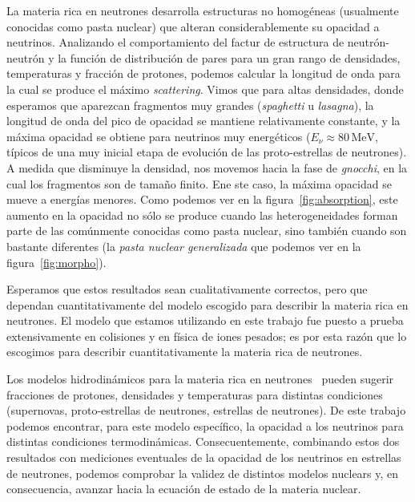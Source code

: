 La materia rica en neutrones desarrolla estructuras no homogéneas (usualmente conocidas como pasta nuclear) que alteran considerablemente su opacidad a neutrinos.
Analizando el comportamiento del factur de estructura de neutrón-neutrón y la función de distribución de pares para un gran rango de densidades, temperaturas y fracción de protones, podemos calcular la longitud de onda para la cual se produce el máximo \emph{scattering}.
Vimos que para altas densidades, donde esperamos que aparezcan fragmentos muy grandes (\emph{spaghetti} u \emph{lasagna}), la longitud de onda del pico de opacidad se mantiene relativamente constante, y la máxima opacidad se obtiene para neutrinos muy energéticos ($E_\nu \approx 80\,\text{MeV}$, típicos de una muy inicial etapa de evolución de las proto-estrellas de neutrones).
A medida que disminuye la densidad, nos movemos hacia la fase de \emph{gnocchi}, en la cual los fragmentos son de tamaño finito.
Ene ste caso, la máxima opacidad se mueve a energías menores.
Como podemos ver en la figura~\ref{fig:absorption}, este aumento en la opacidad no sólo se produce cuando las heterogeneidades forman parte de las comúnmente conocidas como pasta nuclear, sino también cuando son bastante diferentes (la \emph{pasta nuclear generalizada} que podemos ver en la figura~\ref{fig:morpho}).

Esperamos que estos resultados sean cualitativamente correctos, pero que dependan cuantitativamente del modelo escogido para describir la materia rica en neutrones.
El modelo que estamos utilizando en este trabajo fue puesto a prueba extensivamente en colisiones y en física de iones pesados; es por esta razón que lo escogimos para describir cuantitativamente la materia rica de neutrones.

Los modelos hidrodinámicos para la materia rica en neutrones~\cite{ruffert_coalescing_1995, mezzacappa_investigation_1998, geppert_temperature_2004, woosley_physics_2005, liebendorfer_supernova_2005} pueden sugerir fracciones de protones, densidades y temperaturas para distintas condiciones (supernovas, proto-estrellas de neutrones, estrellas de neutrones).
De este trabajo podemos encontrar, para este modelo específico, la opacidad a los neutrinos para distintas condiciones termodinámicas.
Consecuentemente, combinando estos dos resultados con mediciones eventuales de la opacidad de los neutrinos en estrellas de neutrones, podemos comprobar la validez de distintos modelos nuclears y, en consecuencia, avanzar hacia la ecuación de estado de la materia nuclear.

